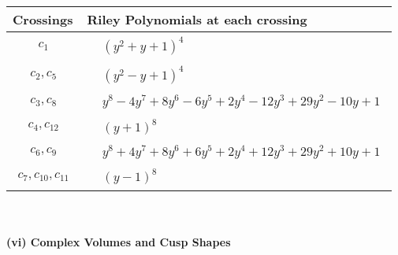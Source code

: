 \documentclass[1p]{elsarticle_modified}
\theoremstyle{definition}
\begin{document}
\begin{tabular}{m{50pt}|m{274pt}}
Crossings & \hspace{64pt}Riley Polynomials at each crossing \\
\hline $$\begin{aligned}c_{1}\end{aligned}$$&$\begin{aligned}
&(y^2+y+1)^4
\end{aligned}$\\
\hline $$\begin{aligned}c_{2},c_{5}\end{aligned}$$&$\begin{aligned}
&(y^2- y+1)^4
\end{aligned}$\\
\hline $$\begin{aligned}c_{3},c_{8}\end{aligned}$$&$\begin{aligned}
&y^8-4 y^7+8 y^6-6 y^5+2 y^4-12 y^3+29 y^2-10 y+1
\end{aligned}$\\
\hline $$\begin{aligned}c_{4},c_{12}\end{aligned}$$&$\begin{aligned}
&(y+1)^8
\end{aligned}$\\
\hline $$\begin{aligned}c_{6},c_{9}\end{aligned}$$&$\begin{aligned}
&y^8+4 y^7+8 y^6+6 y^5+2 y^4+12 y^3+29 y^2+10 y+1
\end{aligned}$\\
\hline $$\begin{aligned}c_{7},c_{10},c_{11}\end{aligned}$$&$\begin{aligned}
&(y-1)^8
\end{aligned}$\\
\hline
\end{tabular}\\~\\
\newpage\flushleft \textbf{(vi) Complex Volumes and Cusp Shapes}
\end{document}
